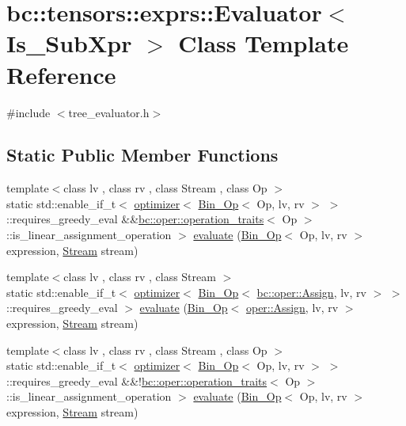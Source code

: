 \hypertarget{classbc_1_1tensors_1_1exprs_1_1Evaluator}{}\section{bc\+:\+:tensors\+:\+:exprs\+:\+:Evaluator$<$ Is\+\_\+\+Sub\+Xpr $>$ Class Template Reference}
\label{classbc_1_1tensors_1_1exprs_1_1Evaluator}


{\ttfamily \#include $<$tree\+\_\+evaluator.\+h$>$}

\subsection*{Static Public Member Functions}
\begin{DoxyCompactItemize}
\item 
{\footnotesize template$<$class lv , class rv , class Stream , class Op $>$ }\\static std\+::enable\+\_\+if\+\_\+t$<$ \hyperlink{structbc_1_1tensors_1_1exprs_1_1optimizer}{optimizer}$<$ \hyperlink{structbc_1_1tensors_1_1exprs_1_1Bin__Op}{Bin\+\_\+\+Op}$<$ Op, lv, rv $>$ $>$\+::requires\+\_\+greedy\+\_\+eval \&\&\hyperlink{structbc_1_1oper_1_1operation__traits}{bc\+::oper\+::operation\+\_\+traits}$<$ Op $>$\+::is\+\_\+linear\+\_\+assignment\+\_\+operation $>$ \hyperlink{classbc_1_1tensors_1_1exprs_1_1Evaluator_a9a43e40f6f00a9e055b9d136a3120cab}{evaluate} (\hyperlink{structbc_1_1tensors_1_1exprs_1_1Bin__Op}{Bin\+\_\+\+Op}$<$ Op, lv, rv $>$ expression, \hyperlink{classbc_1_1streams_1_1Stream}{Stream} stream)
\item 
{\footnotesize template$<$class lv , class rv , class Stream $>$ }\\static std\+::enable\+\_\+if\+\_\+t$<$ \hyperlink{structbc_1_1tensors_1_1exprs_1_1optimizer}{optimizer}$<$ \hyperlink{structbc_1_1tensors_1_1exprs_1_1Bin__Op}{Bin\+\_\+\+Op}$<$ \hyperlink{structbc_1_1oper_1_1Assign}{bc\+::oper\+::\+Assign}, lv, rv $>$ $>$\+::requires\+\_\+greedy\+\_\+eval $>$ \hyperlink{classbc_1_1tensors_1_1exprs_1_1Evaluator_abe5caeeb4304b39785a5bb0b9af8d4e2}{evaluate} (\hyperlink{structbc_1_1tensors_1_1exprs_1_1Bin__Op}{Bin\+\_\+\+Op}$<$ \hyperlink{structbc_1_1oper_1_1Assign}{oper\+::\+Assign}, lv, rv $>$ expression, \hyperlink{classbc_1_1streams_1_1Stream}{Stream} stream)
\item 
{\footnotesize template$<$class lv , class rv , class Stream , class Op $>$ }\\static std\+::enable\+\_\+if\+\_\+t$<$ \hyperlink{structbc_1_1tensors_1_1exprs_1_1optimizer}{optimizer}$<$ \hyperlink{structbc_1_1tensors_1_1exprs_1_1Bin__Op}{Bin\+\_\+\+Op}$<$ Op, lv, rv $>$ $>$\+::requires\+\_\+greedy\+\_\+eval \&\&!\hyperlink{structbc_1_1oper_1_1operation__traits}{bc\+::oper\+::operation\+\_\+traits}$<$ Op $>$\+::is\+\_\+linear\+\_\+assignment\+\_\+operation $>$ \hyperlink{classbc_1_1tensors_1_1exprs_1_1Evaluator_a6e25e55959c4a3e33cc50116872c19da}{evaluate} (\hyperlink{structbc_1_1tensors_1_1exprs_1_1Bin__Op}{Bin\+\_\+\+Op}$<$ Op, lv, rv $>$ expression, \hyperlink{classbc_1_1streams_1_1Stream}{Stream} stream)

\end{DoxyCompactItemize}
